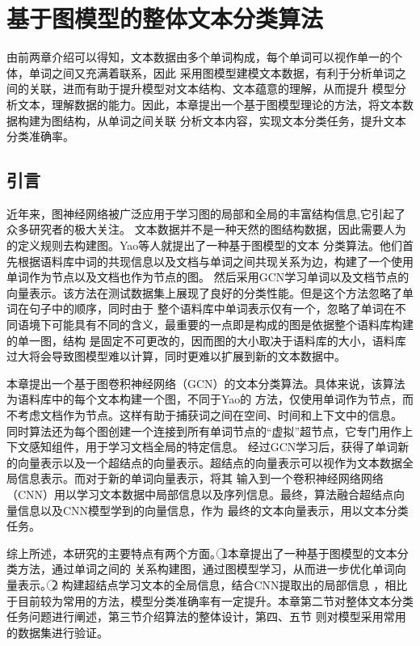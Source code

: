 \chapter{基于图模型的整体文本分类算法}
由前两章介绍可以得知，文本数据由多个单词构成，每个单词可以视作单一的个体，单词之间又充满着联系，因此
采用图模型建模文本数据，有利于分析单词之间的关联，进而有助于提升模型对文本结构、文本蕴意的理解，从而提升
模型分析文本，理解数据的能力。因此，本章提出一个基于图模型理论的方法，将文本数据构建为图结构，从单词之间关联
分析文本内容，实现文本分类任务，提升文本分类准确率。
\section{引言}
近年来，图神经网络被广泛应用于学习图的局部和全局的丰富结构信息,它引起了众多研究者的极大关注。
文本数据并不是一种天然的图结构数据，因此需要人为的定义规则去构建图。Yao等人就提出了一种基于图模型的文本
分类算法。他们首先根据语料库中词的共现信息以及文档与单词之间共现关系为边，构建了一个使用单词作为节点以及文档也作为节点的图。
然后采用GCN学习单词以及文档节点的向量表示。该方法在测试数据集上展现了良好的分类性能。但是这个方法忽略了单词在句子中的顺序，同时由于
整个语料库中单词表示仅有一个，忽略了单词在不同语境下可能具有不同的含义，最重要的一点即是构成的图是依据整个语料库构建的单一图，结构
是固定不可更改的，因而图的大小取决于语料库的大小，语料库过大将会导致图模型难以计算，同时更难以扩展到新的文本数据中。

本章提出一个基于图卷积神经网络（GCN）的文本分类算法。具体来说，该算法为语料库中的每个文本构建一个图，不同于Yao的
方法，仅使用单词作为节点，而不考虑文档作为节点。这样有助于捕获词之间在空间、时间和上下文中的信息。
同时算法还为每个图创建一个连接到所有单词节点的“虚拟”超节点，它专门用作上下文感知组件，用于学习文档全局的特定信息。
经过GCN学习后，获得了单词新的向量表示以及一个超结点的向量表示。超结点的向量表示可以视作为文本数据全局信息表示。而对于新的单词向量表示，将其
输入到一个卷积神经网络网络（CNN）用以学习文本数据中局部信息以及序列信息。最终，算法融合超结点向量信息以及CNN模型学到的向量信息，作为
最终的文本向量表示，用以文本分类任务。

综上所述，本研究的主要特点有两个方面。\noindent\textcircled{1}本章提出了一种基于图模型的文本分类方法，通过单词之间的
关系构建图，通过图模型学习，从而进一步优化单词向量表示。\noindent\textcircled{2} 构建超结点学习文本的全局信息，结合CNN提取出的局部信息
，相比于目前较为常用的方法，模型分类准确率有一定提升。本章第二节对整体文本分类任务问题进行阐述，第三节介绍算法的整体设计，第四、五节
则对模型采用常用的数据集进行验证。

